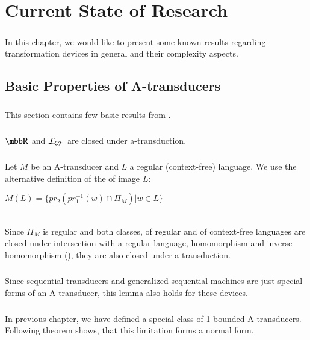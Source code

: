 \chapter{Current State of Research}
\label{chap:currentState}

\paragraph{}
In this chapter, we would like to present some known results regarding transformation devices in general and their complexity aspects.

\section{Basic Properties of A-transducers}
\paragraph{}
This section contains few basic results from \cite{gin:AATPFL}.

\paragraph{}
\clema $\R $ and $\CF $ are closed under a-transduction.

\paragraph{}
\dokaz Let $M$ be an A-transducer and $L$ a regular (context-free) language. We use the alternative definition of the of image $L$:\\
\centerline{$M(L) = \{ pr_{2}(pr_{1}^{-1}(w) \cap \Pi_{M}) | w \in L \}$} \\
Since $\Pi_{M}$ is regular and both classes, of regular and of context-free languages are closed under intersection with a regular language, homomorphism and inverse homomorphism (\cite{hopcroft:fola}), they are also closed under a-transduction. \square

\paragraph{}
\cdosledok Since sequential transducers and generalized sequential machines are just special forms of an A-transducer, this lemma also holds for these devices.

\paragraph{}
In previous chapter, we have defined a special class of 1-bounded A-transducers. Following theorem shows, that this limitation forms a normal form.

